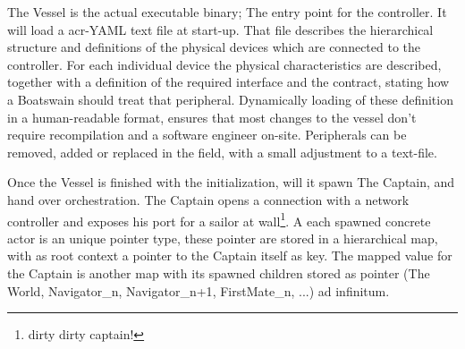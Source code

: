 The Vessel is the actual executable binary; The entry point for the controller. It will load a \gls{acr-YAML}
text file at start-up. That file describes the hierarchical structure and definitions of the physical devices which are
connected to the controller. For each individual device the physical characteristics are described, together with a
definition of the required interface and the contract, stating how a Boatswain should treat that peripheral. Dynamically
loading of these definition in a human-readable format, ensures that most changes to the vessel don't require
recompilation and a software engineer on-site. Peripherals can be removed, added or replaced in the field, with a small
adjustment to a text-file.

Once the Vessel is finished with the initialization, will it spawn The Captain, and hand over orchestration. The Captain
opens a connection with a network controller and exposes his port for a sailor at wall\footnote{dirty dirty captain!}. A
each spawned concrete actor is an unique pointer type, these pointer are stored in a hierarchical map, with as root
context a pointer to the Captain itself as key. The mapped value for the Captain is another map with its spawned
children stored as pointer (The World, Navigator\_n, Navigator\_{n+1}, FirstMate\_n, ...) ad infinitum.
